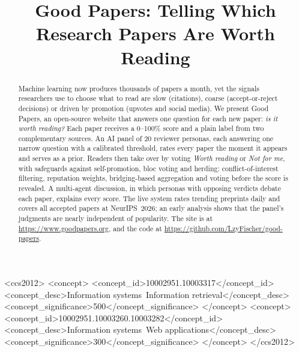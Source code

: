 \documentclass[sigconf]{acmart}
\newcommand{\democode}{\url{https://github.com/LzyFischer/good-papers}}
\newcommand{\demosite}{\url{https://www.goodpapers.org}}
\newcommand{\sys}{Good Papers}
\begin{document}
\title{Good Papers: Telling Which Research Papers Are Worth Reading}



\renewcommand{\shortauthors}{Lei et al.}

\begin{abstract}
Machine learning now produces thousands of papers a month, yet the signals researchers use to choose what to read are slow (citations), coarse (accept-or-reject decisions) or driven by promotion (upvotes and social media).
We present \sys{}, an open-source website that answers one question for each new paper: \emph{is it worth reading?}
Each paper receives a 0--100\% score and a plain label from two complementary sources.
An AI panel of 20 reviewer personas, each answering one narrow question with a calibrated threshold, rates every paper the moment it appears and serves as a prior.
Readers then take over by voting \emph{Worth reading} or \emph{Not for me}, with safeguards against self-promotion, bloc voting and herding: conflict-of-interest filtering, reputation weights, bridging-based aggregation and voting before the score is revealed.
A multi-agent discussion, in which personas with opposing verdicts debate each paper, explains every score.
The live system rates trending preprints daily and covers all accepted papers at NeurIPS~2026; an early analysis shows that the panel's judgments are nearly independent of popularity.
The site is at \demosite, and the code at \democode.
\end{abstract}

\begin{CCSXML}
<ccs2012>
   <concept>
       <concept_id>10002951.10003317</concept_id>
       <concept_desc>Information systems~Information retrieval</concept_desc>
       <concept_significance>500</concept_significance>
   </concept>
   <concept>
       <concept_id>10002951.10003260.10003282</concept_id>
       <concept_desc>Information systems~Web applications</concept_desc>
       <concept_significance>300</concept_significance>
   </concept>
</ccs2012>
\end{CCSXML}
\end{document}
